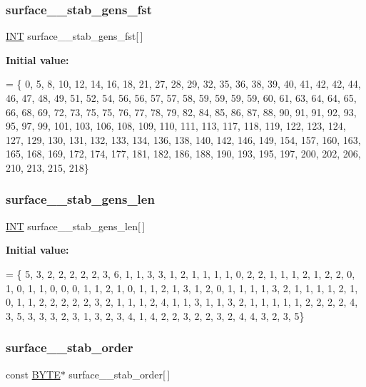 \subsubsection{\texorpdfstring{surface\+\_\+\_\+stab\+\_\+gens\+\_\+fst}{surface\_49\_stab\_gens\_fst}}
{\footnotesize\ttfamily \mbox{\hyperlink{galois_8h_a09fddde158a3a20bd2dcadb609de11dc}{I\+NT}} surface\+\_\+\_\+stab\+\_\+gens\+\_\+fst\mbox{[}$\,$\mbox{]}}

{\bfseries Initial value\+:}
\begin{DoxyCode}
= \{ 0, 5, 8, 10, 12, 14, 16, 18, 21, 27, 
    28, 29, 32, 35, 36, 38, 39, 40, 41, 42, 
    42, 44, 46, 47, 48, 49, 51, 52, 54, 56, 
    56, 57, 57, 58, 59, 59, 59, 59, 60, 61, 
    63, 64, 64, 65, 66, 68, 69, 72, 73, 75, 
    75, 76, 77, 78, 79, 82, 84, 85, 86, 87, 
    88, 90, 91, 91, 92, 93, 95, 97, 99, 101, 
    103, 106, 108, 109, 110, 111, 113, 117, 118, 119, 
    122, 123, 124, 127, 129, 130, 131, 132, 133, 134, 
    136, 138, 140, 142, 146, 149, 154, 157, 160, 163, 
    165, 168, 169, 172, 174, 177, 181, 182, 186, 188, 
    190, 193, 195, 197, 200, 202, 206, 210, 213, 215, 
    218\}
\end{DoxyCode}
\mbox{\label{surface__49_8_c_ad2c721e7917fd13dd57444fe6dddfb25}} 
\subsubsection{\texorpdfstring{surface\+\_\+\_\+stab\+\_\+gens\+\_\+len}{surface\_49\_stab\_gens\_len}}
{\footnotesize\ttfamily \mbox{\hyperlink{galois_8h_a09fddde158a3a20bd2dcadb609de11dc}{I\+NT}} surface\+\_\+\_\+stab\+\_\+gens\+\_\+len\mbox{[}$\,$\mbox{]}}

{\bfseries Initial value\+:}
\begin{DoxyCode}
= \{ 5, 3, 2, 2, 2, 2, 2, 3, 6, 1, 
    1, 3, 3, 1, 2, 1, 1, 1, 1, 0, 
    2, 2, 1, 1, 1, 2, 1, 2, 2, 0, 
    1, 0, 1, 1, 0, 0, 0, 1, 1, 2, 
    1, 0, 1, 1, 2, 1, 3, 1, 2, 0, 
    1, 1, 1, 1, 3, 2, 1, 1, 1, 1, 
    2, 1, 0, 1, 1, 2, 2, 2, 2, 2, 
    3, 2, 1, 1, 1, 2, 4, 1, 1, 3, 
    1, 1, 3, 2, 1, 1, 1, 1, 1, 2, 
    2, 2, 2, 4, 3, 5, 3, 3, 3, 2, 
    3, 1, 3, 2, 3, 4, 1, 4, 2, 2, 
    3, 2, 2, 3, 2, 4, 4, 3, 2, 3, 
    5\}
\end{DoxyCode}
\mbox{\label{surface__49_8_c_ad14407db2d0fd6e200281e54c92331a5}} 
\subsubsection{\texorpdfstring{surface\+\_\+\_\+stab\+\_\+order}{surface\_49\_stab\_order}}
{\footnotesize\ttfamily const \mbox{\hyperlink{galois_8h_ab6cc7b4aeb6ea31aba2b3fbfc83ff5e6}{B\+Y\+TE}}$\ast$ surface\+\_\+\_\+stab\+\_\+order\mbox{[}$\,$\mbox{]}}

